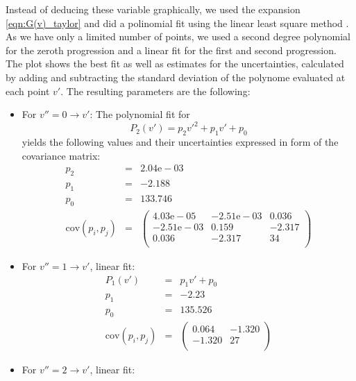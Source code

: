 Instead of deducing these variable graphically, we used the expansion 
\eqref{eqn:G(v)_taylor} and did a 
polinomial fit using the linear least square method \cite{cowan1998statistical}. 
As we have only a limited number of points, we used a second degree polynomial
for the zeroth progression and a linear fit for the first and second progression. 
The plot shows the best fit as well as estimates for the uncertainties, 
calculated by adding and subtracting the standard deviation of the 
polynome evaluated at each point $v'$. 
The resulting parameters are the following:
\begin{itemize}
    \item For $v'' = 0 \rightarrow v'$: The polynomial fit for 
        \begin{equation}
            P_2(v') = p_2 {v'}^2 + p_1 v' + p_0
        \end{equation}
        yields the following values and their uncertainties expressed in form of 
        the covariance matrix:
        \begin{eqnarray}
            p_2 &=& 2.04\mathrm{e}-03 \\
            p_1 &=& -2.188 \\
            p_0 &=& 133.746 \\
            \mathrm{cov}(p_i, p_j) &=& 
            \begin{pmatrix}
                 4.03\mathrm{e}-05 & -2.51\mathrm{e}-03 & 0.036 \\
                 -2.51\mathrm{e}-03 & 0.159 & -2.317 \\
                 0.036 & -2.317 & 34 \\
            \end{pmatrix}
        \end{eqnarray}
    \item For $v'' = 1 \rightarrow v'$, linear fit:
        \begin{eqnarray}
            P_1(v') &=& p_1 v' + p_0 \\
            p_1 &=& -2.23 \\
            p_0 &=& 135.526 \\
            \mathrm{cov}(p_i, p_j) &=& 
            \begin{pmatrix}
                 0.064 & -1.320 \\
                 -1.320 & 27 \\
            \end{pmatrix}
        \end{eqnarray}
    \item For $v'' = 2 \rightarrow v'$, linear fit:

\end{itemize}
